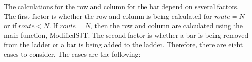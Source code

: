 The calculations for the row and column for the bar 
depend on several factors. The first factor is whether the row and column is being calculated for $route=N$ or 
if $route < N$. If $route=N$, then the row and column are calculated using the main function, ModifiedSJT. The second factor 
is whether a bar is being removed from the ladder or a bar is being added to the ladder. Therefore, there are eight cases 
to consider. The cases are the following: 
\begin{caseof}
\end{caseof}


